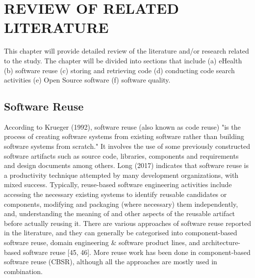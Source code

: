 \documentclass[a4paper]{article}
\begin{document}
 \vspace{-10pt}
\section{REVIEW OF RELATED LITERATURE}
\vspace{-10pt}
This chapter will provide detailed review of the literature and/or research related to the study. The
chapter will be divided into sections that include (a) eHealth (b) software reuse (c) storing and retrieving code (d) conducting code search activities (e) Open Source software (f) software quality.


\subsection{Software Reuse}
According to Krueger (1992), software reuse (also known as code reuse) "is the process of creating software systems from existing software rather than building software systems from scratch." It involves the use of some previously constructed software artifacts such as source code, libraries, components and requirements and design documents among others. Long (2017) indicates that software reuse is a productivity technique attempted by many development organizations, with mixed success. Typically, reuse-based software engineering activities include accessing the necessary existing systems to identify
reusable candidates or components, modifying and packaging (where necessary)
them independently, and, understanding the meaning of and other aspects of the reusable artifact before actually reusing it. There are various approaches of software reuse reported in the literature, and they can generally be categorised into component-based software reuse, domain engineering & software product lines, and architecture-based  software reuse [45, 46]. More reuse work has been done in component-based software reuse (CBSR), although all the approaches are mostly used in combination. \\
\end{document}

